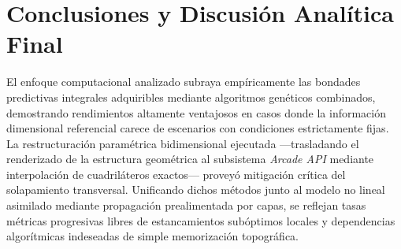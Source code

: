 \documentclass[10pt,twocolumn,letterpaper]{article}
\begin{document}
\section{Conclusiones y Discusión Analítica Final}
El enfoque computacional analizado subraya empíricamente las bondades predictivas integrales adquiribles mediante algoritmos genéticos combinados, demostrando rendimientos altamente ventajosos en casos donde la información dimensional referencial carece de escenarios con condiciones estrictamente fijas. La restructuración paramétrica bidimensional ejecutada —trasladando el renderizado de la estructura geométrica al subsistema \textit{Arcade API} mediante interpolación de cuadriláteros exactos— proveyó mitigación crítica del solapamiento transversal. Unificando dichos métodos junto al modelo no lineal asimilado mediante propagación prealimentada por capas, se reflejan tasas métricas progresivas libres de estancamientos subóptimos locales y dependencias algorítmicas indeseadas de simple memorización topográfica.
\end{document}

